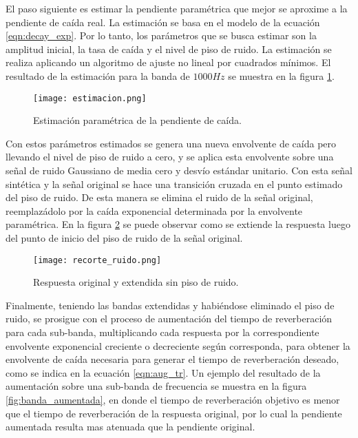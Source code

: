 El paso siguiente es estimar la pendiente paramétrica que mejor se aproxime a la pendiente de caída real. La estimación se basa en el modelo de la ecuación \ref{eqn:decay_exp}. Por lo tanto, los parámetros que se busca estimar son la amplitud inicial, la tasa de caída y el nivel de piso de ruido. La estimación se realiza aplicando un algoritmo de ajuste no lineal por cuadrados mínimos. El resultado de la estimación para la banda de $1000 Hz$ se muestra en la figura  \ref{fig:estimacion_parametrica}.

\begin{figure}[H]
	\centering{}
	\texttt{[image: estimacion.png]}
	\caption{Estimación paramétrica de la pendiente de caída.}
	\label{fig:estimacion_parametrica}
\end{figure}

Con estos parámetros estimados se genera una nueva envolvente de caída pero llevando el nivel de piso de ruido a cero, y se aplica esta envolvente sobre una señal de ruido Gaussiano de media cero y desvío estándar unitario. Con esta señal sintética y la señal original se hace una transición cruzada en el punto estimado del piso de ruido. De esta manera se elimina el ruido de la señal original, reemplazádolo por la caída exponencial determinada por la envolvente paramétrica.  En la figura \ref{fig:recorte_ruido} se puede observar como se extiende la respuesta luego del punto de inicio del piso de ruido de la señal original.

\begin{figure}[H]
	\centering{}
	\texttt{[image: recorte\_ruido.png]}
	\caption{Respuesta original y extendida sin piso de ruido.}
	\label{fig:recorte_ruido}
\end{figure}
  
Finalmente, teniendo las bandas extendidas y habiéndose eliminado el piso de ruido, se prosigue con el proceso de aumentación del tiempo de reverberación para cada sub-banda, multiplicando cada respuesta por la correspondiente envolvente exponencial creciente o decreciente según corresponda, para obtener la envolvente de caída necesaria para generar el tiempo de reverberación deseado, como se indica en la ecuación \ref{eqn:aug_tr}. Un ejemplo del resultado de la aumentación sobre una sub-banda de frecuencia se muestra en la figura \ref{fig:banda_aumentada}, en donde el tiempo de reverberación objetivo es menor que el tiempo de reverberación de la respuesta original, por lo cual la pendiente aumentada resulta mas atenuada que la pendiente original. 

